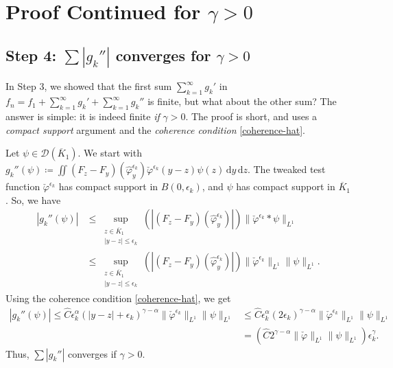 
\chapter{Proof Continued for \texorpdfstring{$\gamma > 0$}{gamma > 0}}\label{chapter:proof-gamma-positive}

\section{Step 4: \texorpdfstring{$\sum |g_k''|$ converges for $\gamma > 0$}{sum g''k converges for gamma > 0}}\label{step4}

In Step 3, we showed that the first sum $\sum_{k=1}^\infty g_k'$ in $f_n = f_1 + \sum_{k=1}^\infty g_k' + \sum_{k=1}^\infty g_k''$ is finite, but what about the other sum? The answer is simple: it is indeed finite \emph{if} $\gamma > 0$. The proof is short, and uses a \emph{compact support} argument and the \emph{coherence condition} \eqref{coherence-hat}.

Let $\psi \in \mathcal{D}(\overline K_1)$. We start with $g_k''(\psi) \coloneqq \iint (F_z - F_y)(\hat{\varphi}^{\epsilon_k}_{y}) \check \varphi^{\epsilon_k}(y-z) \psi(z) \, \mathrm{d}y \, \mathrm{d}z$. The tweaked test function $\check \varphi^{\epsilon_k}$ has compact support in $B(0,\epsilon_k)$, and $\psi$ has compact support in $\overline K_1$. So, we have 
\begin{align*}
    |g_k''(\psi)| 
    &\leq \sup_{\substack{z \in \overline{K}_1 \\ |y-z|\leq \epsilon_k}}
    \left( |(F_z -F_y)(\hat \varphi^{\epsilon_k}_y)| \right) \lVert \check \varphi^{\epsilon_k} * \psi \rVert_{L^1}\\
    &\leq \sup_{\substack{z \in \overline{K}_1 \\ |y-z|\leq \epsilon_k}}
    \left( |(F_z -F_y)(\hat \varphi^{\epsilon_k}_y)| \right) \lVert \check \varphi^{\epsilon_k} \rVert_{L^1} \lVert \psi \rVert_{L^1}.
\end{align*}
Using the coherence condition \eqref{coherence-hat}, we get
\begin{align}
    |g_k''(\psi)| 
    \leq \hat C \epsilon_k^\alpha (|y-z| + \epsilon_k)^{\gamma - \alpha} \lVert \check \varphi^{\epsilon_k} \rVert_{L^1} \lVert \psi \rVert_{L^1}
    &\leq \hat C \epsilon_k^\alpha (2\epsilon_k)^{\gamma - \alpha} \lVert \check \varphi^{\epsilon_k} \rVert_{L^1} \lVert \psi \rVert_{L^1}\nonumber\\
    &= \left(\hat C  2^{\gamma - \alpha} \lVert \check \varphi \rVert_{L^1} \lVert \psi \rVert_{L^1}\right) \epsilon_k^\gamma. \label{Mustermaus}
\end{align}
Thus, $\sum |g_k''|$ converges if $\gamma > 0$.

